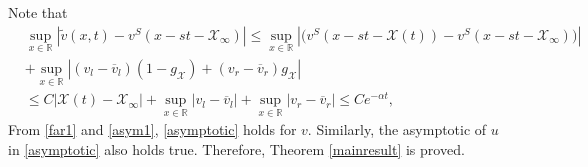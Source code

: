 \documentclass[12pt,reqno]{amsart}
\numberwithin{equation}{section}
\newcommand{\norm}[1]{\left\lVert #1 \right\rVert}
\def\R{\mathbb{R}}
\def\avl{\overline{v}_l}
\def\avr{\overline{v}_r}
\def\vt{\tilde{v}}
\def\X{\mathcal{X}}
\begin{document}
Note that
\begin{equation}\label{asym1}
	\begin{aligned}
		&\mathop{sup}\limits_{x \in \R}|\vt(x,t)-v^S(x-st-\X_{\infty})|\leq \mathop{sup}\limits_{x \in \R}|\big(v^S(x-st-\X(t))-v^S(x-st-\X_{\infty})\big)|\\
		&+\mathop{sup}\limits_{x \in \R}|(v_l-\avl)(1-g_{\X})+(v_r-\avr)g_{\X}|\\
		&\leq C|\X(t)-\X_{\infty}|+\mathop{sup}\limits_{x \in \R}|v_l-\avl|+\mathop{sup}\limits_{x \in \R}|v_r-\avr|\leq Ce^{-\alpha t},
	\end{aligned}
\end{equation}
From \eqref{far1} and \eqref{asym1}, \eqref{asymptotic} holds for $v$. Similarly, the asymptotic of $u$ in \eqref{asymptotic} also holds true. Therefore, Theorem \ref{mainresult} is proved.
\end{document}
